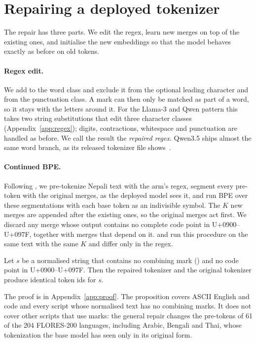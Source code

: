 \section{Repairing a deployed tokenizer}
\label{sec:method}

The repair has three parts. We edit the regex, learn new merges on top of the existing ones, and initialise the new embeddings so that the model behaves exactly as before on old tokens.

\paragraph{Regex edit.} We add \pM{} to the word class and exclude it from the optional leading character and from the punctuation class. A mark can then only be matched as part of a word, so it stays with the letters around it. For the Llama-3 and Qwen pattern this takes two string substitutions that edit three character classes (Appendix~\ref{app:regex}); digits, contractions, whitespace and punctuation are handled as before. We call the result the \emph{repaired regex}. Qwen3.5 ships almost the same word branch, as its released tokenizer file shows~\citep{qwen35tokenizer}.

\paragraph{Continued BPE.} Following \citet{purason-etal-2026-teaching}, we pre-tokenize Nepali text with the arm's regex, segment every pre-token with the original merges, as the deployed model sees it, and run BPE over these segmentations with each base token as an indivisible symbol. The $K$ new merges are appended after the existing ones, so the original merges act first. We discard any merge whose output contains no complete code point in U+0900--U+097F, together with merges that depend on it. \RI{} and \RII{} run this procedure on the same text with the same $K$ and differ only in the regex.

\begin{proposition}
\label{prop:lossless}
Let $s$ be a normalised string that contains no combining mark (\pM{}) and no code point in U+0900--U+097F. Then the repaired tokenizer \RII{} and the original tokenizer produce identical token ids for $s$.
\end{proposition}
The proof is in Appendix~\ref{app:proof}. The proposition covers ASCII English and code and every script whose normalised text has no combining marks. It does not cover other scripts that use marks: the general repair changes the pre-tokens of 61 of the 204 FLORES-200 languages, including Arabic, Bengali and Thai, whose tokenization the base model has seen only in its original form.

